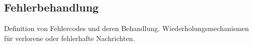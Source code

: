 \subsection{Fehlerbehandlung}

Definition von Fehlercodes und deren Behandlung.
Wiederholungsmechanismen für verlorene oder fehlerhafte Nachrichten.